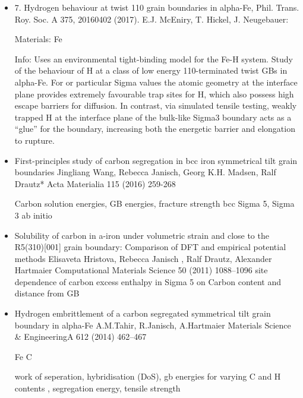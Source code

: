 \documentclass[11pt,floatfix,showpacs]{amsart}
\begin{document}
\begin{itemize}
\item 7.	Hydrogen behaviour at twist {110} grain boundaries in alpha-Fe, 
Phil. Trans. Roy. Soc. A 375, 20160402 (2017).
E.J. McEniry, T. Hickel, J. Neugebauer:

Materials: Fe

Info: Uses an environmental tight-binding model for the Fe-H system. Study  of the behaviour of H at a class of low energy {110}-terminated twist GBs in alpha-Fe. For or particular Sigma values the atomic geometry at the interface plane provides extremely favourable trap sites for H, which also possess high escape barriers for diffusion. In contrast, via simulated tensile testing, weakly trapped H at the interface plane of the bulk-like Sigma3 boundary acts as a “glue” for the boundary, increasing both the energetic barrier and elongation to rupture.

\item First-principles study of carbon segregation in bcc iron symmetrical
tilt grain boundaries
Jingliang Wang, Rebecca Janisch, Georg K.H. Madsen, Ralf Drautz*
Acta Materialia 115 (2016) 259-268

Carbon solution energies, GB energies, fracture strength bcc Sigma 5, Sigma 3 ab initio

\item Solubility of carbon in a-iron under volumetric strain and close to the
R5(310)[001] grain boundary: Comparison of DFT and empirical potential methods
Elisaveta Hristova, Rebecca Janisch , Ralf Drautz, Alexander Hartmaier
Computational Materials Science 50 (2011) 1088–1096
site dependence of carbon excess enthalpy in Sigma 5 on Carbon content and distance from GB

\item Hydrogen embrittlement of a carbon segregated symmetrical tilt grain boundary in alpha-Fe
A.M.Tahir, R.Janisch, A.Hartmaier
Materials Science \& EngineeringA 612 (2014) 462–467

Fe C 

work of seperation, hybridisation (DoS), gb energies for varying C and H contents , segregation energy, tensile strength


\end{itemize}
\end{document}
